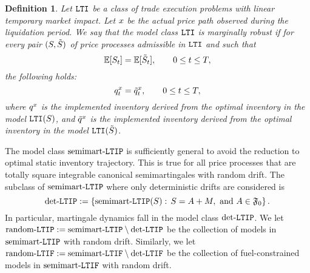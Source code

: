 \documentclass[10pt,a4paper]{article}
\newtheorem{defi}[thm]{Definition}
\begin{document}
	\begin{defi}\label{defi.marginalRobustnessForLTI}
		Let $\mathtt{LTI}$ be a class of trade execution problems with linear temporary market impact. Let $x$ be the actual price path observed during the liquidation period. We say that the model class $\mathtt{LTI}$ is marginally robust if for every pair $(S,\tilde{S})$  of price processes  admissible in  $\mathtt{LTI}$ and such that 
		\begin{equation*}
		\mathbb{{E}} [S_{t}] = \mathbb{{E}} [\tilde{S}_t], \qquad 0\leq t \leq T,
		\end{equation*}
		the following holds:
		\begin{equation*}
		q^{x}_t = \tilde{q}^{x}_t, \qquad 0\leq t \leq T,
		\end{equation*}
		where $q^{x}$ is the implemented inventory derived from the optimal inventory in the model $\mathtt{LTI}(S)$, and $\tilde{q}^{x}$ is the implemented inventory derived from the optimal inventory in the model $\mathtt{LTI}(\tilde{S})$.
	\end{defi}

	The model class $\text{semimart-}\mathtt{LTIP}$ is sufficiently general to avoid the reduction to optimal static inventory trajectory. This is true for all price processes that are totally square integrable canonical semimartingales with random drift. The subclass of  $\text{semimart-}\mathtt{LTIP}$ where only deterministic drifts are considered is 
	\begin{equation*}
	\text{det-}\mathtt{LTIP} := \left\lbrace \text{semimart-}\mathtt{LTIP}(S): \, S = A + M , \text{ and } A \in \mathfrak{F}_0
	\right\rbrace.
	\end{equation*}
	In particular, martingale dynamics fall in the model class $\text{det-}\mathtt{LTIP}$. We let $\text{random-}\mathtt{LTIP}:=\text{semimart-}\mathtt{LTIP}\setminus\text{det-}\mathtt{LTIP}$ be the collection of models in $\text{semimart-}\mathtt{LTIP}$ with random drift. Similarly, we let $\text{random-}\mathtt{LTIF}:=\text{semimart-}\mathtt{LTIF}\setminus\text{det-}\mathtt{LTIF}$ be the collection of fuel-constrained models in $\text{semimart-}\mathtt{LTIF}$ with random drift.
	
\end{document}
